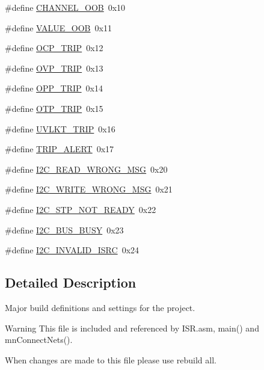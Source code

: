 \begin{DoxyCompactItemize}
\item 
\#define \hyperlink{a00043_a5f4c019658ca5a8eff4bfc3d96d489a0}{C\-H\-A\-N\-N\-E\-L\-\_\-\-O\-O\-B}~0x10
\item 
\#define \hyperlink{a00043_a055087c0064c322a05e443b47479bfe1}{V\-A\-L\-U\-E\-\_\-\-O\-O\-B}~0x11
\item 
\#define \hyperlink{a00043_a42d97deed6614a0b5b0aee655055b43a}{O\-C\-P\-\_\-\-T\-R\-I\-P}~0x12
\item 
\#define \hyperlink{a00043_ac330c784fd08c389f8649ac8e34d29e8}{O\-V\-P\-\_\-\-T\-R\-I\-P}~0x13
\item 
\#define \hyperlink{a00043_a7037d8fd93cf1a2ae591b639614c0338}{O\-P\-P\-\_\-\-T\-R\-I\-P}~0x14
\item 
\#define \hyperlink{a00043_a5815c03ac63c324e326a148e247f24a1}{O\-T\-P\-\_\-\-T\-R\-I\-P}~0x15
\item 
\#define \hyperlink{a00043_a51b770c08a5aa53779faa10653b095a0}{U\-V\-L\-K\-T\-\_\-\-T\-R\-I\-P}~0x16
\item 
\#define \hyperlink{a00043_a374b2278b7b71964ac3b08778e1f9f26}{T\-R\-I\-P\-\_\-\-A\-L\-E\-R\-T}~0x17
\item 
\#define \hyperlink{a00043_aec1cab1af7dceb601fa90842135a4f65}{I2\-C\-\_\-\-R\-E\-A\-D\-\_\-\-W\-R\-O\-N\-G\-\_\-\-M\-S\-G}~0x20
\item 
\#define \hyperlink{a00043_ac6997f1781d1d9047bd556dd5152795b}{I2\-C\-\_\-\-W\-R\-I\-T\-E\-\_\-\-W\-R\-O\-N\-G\-\_\-\-M\-S\-G}~0x21
\item 
\#define \hyperlink{a00043_af623f6210c2ce545f939ec061fc533b0}{I2\-C\-\_\-\-S\-T\-P\-\_\-\-N\-O\-T\-\_\-\-R\-E\-A\-D\-Y}~0x22
\item 
\#define \hyperlink{a00043_ad3082827214b064d5b8289acaeb9ad20}{I2\-C\-\_\-\-B\-U\-S\-\_\-\-B\-U\-S\-Y}~0x23
\item 
\#define \hyperlink{a00043_a8e605ae1b9fc359d203b90cb9f8a090e}{I2\-C\-\_\-\-I\-N\-V\-A\-L\-I\-D\-\_\-\-I\-S\-R\-C}~0x24
\end{DoxyCompactItemize}



\subsection{Detailed Description}
Major build definitions and settings for the project. \begin{DoxyWarning}{Warning}
This file is included and referenced by I\-S\-R.\-asm, main() and mn\-Connect\-Nets().

When changes are made to this file please use rebuild all. 
\end{DoxyWarning}


